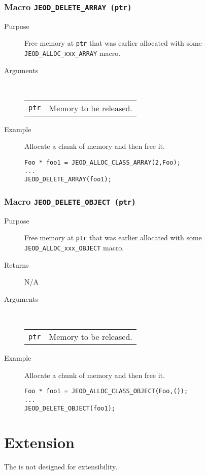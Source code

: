 \subsubsection{Macro {\tt JEOD\_DELETE\_ARRAY (ptr)}}
\begin{description}
\item[Purpose]
Free memory at {\tt ptr} that was earlier allocated with some
{\tt JEOD\_ALLOC\_xxx\_ARRAY} macro.
\item[Arguments] \ \\
\begin{tabular}{@{}ll}
{\tt ptr} &  Memory to be released.
\end{tabular}
\item[Example]
Allocate a chunk of memory and then free it.
\begin{verbatim}
Foo * foo1 = JEOD_ALLOC_CLASS_ARRAY(2,Foo);
...
JEOD_DELETE_ARRAY(foo1);
\end{verbatim}
\end{description}

\subsubsection{Macro {\tt JEOD\_DELETE\_OBJECT (ptr)}}
\begin{description}
\item[Purpose]
Free memory at {\tt ptr} that was earlier allocated with some
{\tt JEOD\_ALLOC\_xxx\_OBJECT} macro.
\item[Returns] N/A
\item[Arguments] \ \\
\begin{tabular}{@{}ll}
{\tt ptr} &  Memory to be released.
\end{tabular}
\item[Example]
Allocate a chunk of memory and then free it.
\begin{verbatim}
Foo * foo1 = JEOD_ALLOC_CLASS_OBJECT(Foo,());
...
JEOD_DELETE_OBJECT(foo1);
\end{verbatim}
\end{description}

\section{Extension}
The \ModelDesc is not designed for extensibility.
